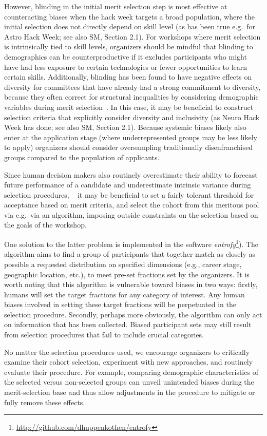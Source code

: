 However, blinding in the initial merit selection step is most effective at counteracting biases when the hack week targets a broad population, where the initial selection does not directly depend on skill level (as has been true e.g.\ for Astro Hack Week; see also SM, Section 2.1). 
For workshops where merit selection is intrinsically tied to skill levels, organizers should be mindful that blinding to demographics can be counterproductive if it excludes participants who might have had less exposure to certain technologies or fewer opportunities to learn certain skills. Additionally, blinding has been found to have negative effects on diversity for committees that have already had a strong commitment to diversity, because they often correct for structural inequalities by considering demographic variables during merit selection~\cite{behaghel2015unintended}.
In this case, it may be beneficial to construct selection criteria that explicitly consider diversity and inclusivity (as Neuro Hack Week has done; see also SM, Section 2.1). 
Because systemic biases likely also enter at the application stage (where underrepresented groups may be less likely to apply) organizers should consider oversampling traditionally disenfranchised groups compared to the population of applicants. 

Since human decision makers also routinely overestimate their ability to forecast future performance of a candidate and underestimate intrinsic variance during selection procedures, ~\cite{highhouse2008} it may be beneficial to set a fairly tolerant threshold for acceptance based on merit criteria, and select the cohort from this meritous pool via e.g.\ via an algorithm, imposing outside constraints on the selection based on the goals of the workshop. 

One solution to the latter problem is implemented in the software \textit{entrofy}\footnote{\url{http://github.com/dhuppenkothen/entrofy}}). 
The algorithm aims to find a group of participants that together match as closely as possible a requested distribution on specified dimensions (e.g., career stage, geographic location, etc.), to meet pre-set fractions set by the organizers.
It is worth noting that this algorithm is vulnerable toward biases in two ways: firstly, humans will set the target fractions for any category of interest.  
Any human biases involved in setting these target fractions will be perpetuated in the selection procedure. 
Secondly, perhaps more obviously, the algorithm can only act on information that has been collected.
Biased participant sets may still result from selection procedures that fail to include crucial categories. 

No matter the selection procedures used, we encourage organizers to critically examine their cohort selection, experiment with new approaches, and routinely evaluate their procedure. For example, comparing demographic characteristics of the selected versus non-selected groups can unveil unintended biases during the merit-selection base and thus allow adjustments in the procedure to mitigate or fully remove these effects.
